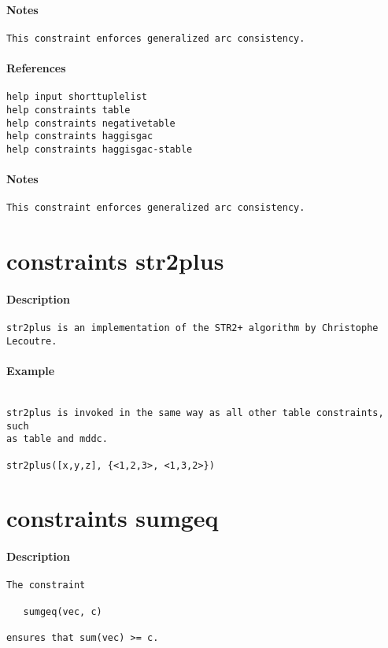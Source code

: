 \paragraph{Notes}
{\footnotesize
\begin{verbatim}
This constraint enforces generalized arc consistency.
\end{verbatim}
}
\paragraph{References}
{\footnotesize
\begin{verbatim}
help input shorttuplelist
help constraints table
help constraints negativetable
help constraints haggisgac
help constraints haggisgac-stable
\end{verbatim}
}
\paragraph{Notes}
{\footnotesize
\begin{verbatim}
This constraint enforces generalized arc consistency.
\end{verbatim}
}
\section{constraints str2plus}
\paragraph{Description}
{\footnotesize
\begin{verbatim}
str2plus is an implementation of the STR2+ algorithm by Christophe Lecoutre.
\end{verbatim}
}
\paragraph{Example}
{\footnotesize
\begin{verbatim}

str2plus is invoked in the same way as all other table constraints, such 
as table and mddc.

str2plus([x,y,z], {<1,2,3>, <1,3,2>})
\end{verbatim}
}
\section{constraints sumgeq}
\paragraph{Description}
{\footnotesize
\begin{verbatim}
The constraint

   sumgeq(vec, c)

ensures that sum(vec) >= c.
\end{verbatim}
}
